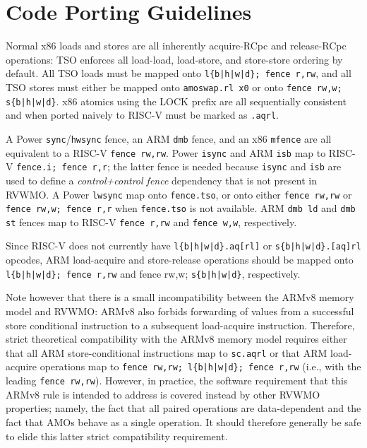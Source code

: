 \section{Code Porting Guidelines}
\label{sec:porting}

Normal x86 loads and stores are all inherently acquire-RCpc and release-RCpc operations: TSO enforces all load-load, load-store, and store-store ordering by default.
All TSO loads must be mapped onto {\tt l\{b|h|w|d\}; fence r,rw}, and all TSO stores must either be mapped onto {\tt amoswap.rl x0} or onto {\tt fence rw,w; s\{b|h|w|d\}}.
x86 atomics using the LOCK prefix are all sequentially consistent and when ported naively to RISC-V must be marked as {\tt .aqrl}.

A Power {\tt sync}/{\tt hwsync} fence, an ARM {\tt dmb} fence, and an x86 {\tt mfence} are all equivalent to a RISC-V {\tt fence rw,rw}.
Power {\tt isync} and ARM {\tt isb} map to RISC-V {\tt fence.i; fence r,r}; the latter fence is needed because {\tt isync} and {\tt isb} are used to define a {\em control+control fence} dependency that is not present in RVWMO.
A Power {\tt lwsync} map onto {\tt fence.tso}, or onto either {\tt fence rw,rw} or {\tt fence rw,w; fence r,r} when {\tt fence.tso} is not available.
ARM {\tt dmb ld} and {\tt dmb st} fences map to RISC-V {\tt fence r,rw} and {\tt fence w,w}, respectively.

Since RISC-V does not currently have {\tt l\{b|h|w|d\}.aq[rl]} or  {\tt s\{b|h|w|d\}.[aq]rl} opcodes, ARM load-acquire and store-release operations should be mapped onto {\tt l\{b|h|w|d\}; fence r,rw} and {fence rw,w; \tt s\{b|h|w|d\}}, respectively.

Note however that there is a small incompatibility between the ARMv8 memory model and RVWMO: ARMv8 also forbids forwarding of values from a successful store conditional instruction to a subsequent load-acquire instruction.
Therefore, strict theoretical compatibility with the ARMv8 memory model requires either that all ARM store-conditional instructions map to {\tt sc.aqrl} or that ARM load-acquire operations map to {\tt fence rw,rw; l\{b|h|w|d\}; fence r,rw} (i.e., with the leading {\tt fence rw,rw}).
However, in practice, the software requirement that this ARMv8 rule is intended to address is covered instead by other RVWMO properties; namely, the fact that all paired operations are data-dependent and the fact that AMOs behave as a single operation.
It should therefore generally be safe to elide this latter strict compatibility requirement.

